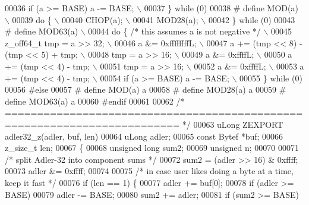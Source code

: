 \begin{DoxyCode}
{00036 \textcolor{preprocessor}{        if (a >= BASE) a -= BASE; \(\backslash\)}
00037 \textcolor{preprocessor}{    \} while (0)}
00038 \textcolor{preprocessor}{#  define MOD(a) \(\backslash\)}
00039 \textcolor{preprocessor}{    do \{ \(\backslash\)}
00040 \textcolor{preprocessor}{        CHOP(a); \(\backslash\)}
00041 \textcolor{preprocessor}{        MOD28(a); \(\backslash\)}
00042 \textcolor{preprocessor}{    \} while (0)}
00043 \textcolor{preprocessor}{#  define MOD63(a) \(\backslash\)}
00044 \textcolor{preprocessor}{    do \{ }\textcolor{comment}{/* this assumes a is not negative */}\textcolor{preprocessor}{ \(\backslash\)}
00045 \textcolor{preprocessor}{        z\_off64\_t tmp = a >> 32; \(\backslash\)}
00046 \textcolor{preprocessor}{        a &= 0xffffffffL; \(\backslash\)}
00047 \textcolor{preprocessor}{        a += (tmp << 8) - (tmp << 5) + tmp; \(\backslash\)}
00048 \textcolor{preprocessor}{        tmp = a >> 16; \(\backslash\)}
00049 \textcolor{preprocessor}{        a &= 0xffffL; \(\backslash\)}
00050 \textcolor{preprocessor}{        a += (tmp << 4) - tmp; \(\backslash\)}
00051 \textcolor{preprocessor}{        tmp = a >> 16; \(\backslash\)}
00052 \textcolor{preprocessor}{        a &= 0xffffL; \(\backslash\)}
00053 \textcolor{preprocessor}{        a += (tmp << 4) - tmp; \(\backslash\)}
00054 \textcolor{preprocessor}{        if (a >= BASE) a -= BASE; \(\backslash\)}
00055 \textcolor{preprocessor}{    \} while (0)}
00056 \textcolor{preprocessor}{#else}
00057 \textcolor{preprocessor}{#  define MOD(a) a %
00058 \textcolor{preprocessor}{#  define MOD28(a) a %
00059 \textcolor{preprocessor}{#  define MOD63(a) a %
00060 \textcolor{preprocessor}{#endif}
00061 
00062 \textcolor{comment}{/* ========================================================================= */}
00063 uLong ZEXPORT adler32\_z(adler, buf, len)
00064     uLong adler;
00065     \textcolor{keyword}{const} Bytef *buf;
00066     z\_size\_t len;
00067 \{
00068     \textcolor{keywordtype}{unsigned} \textcolor{keywordtype}{long} sum2;
00069     \textcolor{keywordtype}{unsigned} n;
00070 
00071     \textcolor{comment}{/* split Adler-32 into component sums */}
00072     sum2 = (adler >> 16) & 0xffff;
00073     adler &= 0xffff;
00074 
00075     \textcolor{comment}{/* in case user likes doing a byte at a time, keep it fast */}
00076     \textcolor{keywordflow}{if} (len == 1) \{
00077         adler += buf[0];
00078         \textcolor{keywordflow}{if} (adler >= BASE)
00079             adler -= BASE;
00080         sum2 += adler;
00081         \textcolor{keywordflow}{if} (sum2 >= BASE)
}}}}
\end{DoxyCode}

